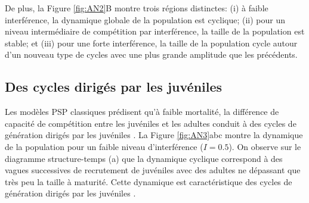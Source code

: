 De plus, la Figure \ref{fig:AN2}B montre trois régions distinctes: (i) à faible
interférence, la dynamique globale de la population est cyclique; (ii) pour un
niveau intermédiaire de compétition par interférence, la taille de la population
est stable; et (iii) pour une forte interférence, la taille de la population
cycle autour d'un nouveau type de cycles avec une plus grande amplitude que les
précédents.

\subsection{Des cycles dirigés par les juvéniles}

Les modèles PSP classiques prédisent qu'à faible mortalité, la différence de
capacité de compétition entre les juvéniles et les adultes conduit à des cycles
de génération dirigés par les juvéniles \autocites{de-roos1992a,de-roos1997a}.
La Figure \ref{fig:AN3}abc montre la dynamique de la population pour un faible
niveau d'interférence ($I=0.5$). On observe sur le diagramme structure-temps (a)
que la dynamique cyclique correspond à des vagues successives de recrutement de
juvéniles avec des adultes ne dépassant que très peu la taille à maturité. Cette
dynamique est caractéristique des cycles de génération dirigés par les juvéniles
\autocites{de-roos1992a,de-roos2003a}.

